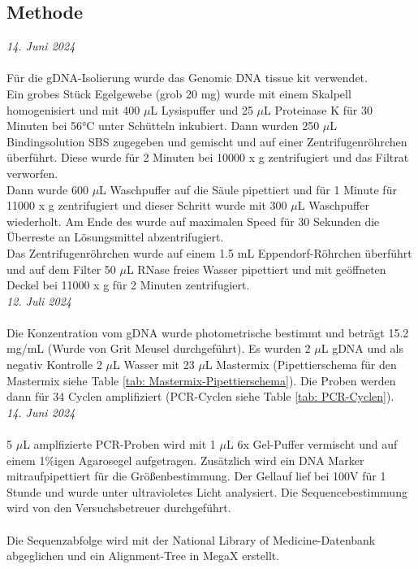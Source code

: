 \documentclass[oneside,10pt,a4paper]{report}
\begin{document}
			\subsection{Methode}
				\textit{14. Juni 2024}\\
				\\
				Für die gDNA-Isolierung wurde das Genomic DNA tissue kit verwendet.\\
				Ein grobes Stück Egelgewebe (grob 20 mg) wurde mit einem Skalpell homogenisiert und mit 400 $\mu$L Lysispuffer und 25 $\mu$L Proteinase K für 30 Minuten bei 56°C unter Schütteln inkubiert. Dann wurden 250 $\mu$L Bindingsolution SBS zugegeben und gemischt und auf einer Zentrifugenröhrchen überführt. Diese wurde für 2 Minuten bei 10000 x g zentrifugiert und das Filtrat verworfen.\\
				Dann wurde 600 $\mu$L Waschpuffer auf die Säule pipettiert und für 1 Minute für 11000 x g zentrifugiert und dieser Schritt wurde mit 300 $\mu$L Waschpuffer wiederholt. Am Ende des wurde auf maximalen Speed für 30 Sekunden die Überreste an Lösungsmittel abzentrifugiert.\\
				Das Zentrifugenröhrchen wurde auf einem 1.5 mL Eppendorf-Röhrchen überführt und auf dem Filter 50 $\mu$L RNase freies Wasser pipettiert und mit geöffneten Deckel bei 11000 x g für 2 Minuten zentrifugiert.
				\\
				\textit{12. Juli 2024}\\
				\\
				Die Konzentration vom gDNA wurde photometrische bestimmt und beträgt 15.2 mg/mL (Wurde von Grit Meusel durchgeführt).
				Es wurden 2 $\mu$L gDNA und als negativ Kontrolle 2 $\mu$L Wasser mit 23 $\mu$L Mastermix (Pipettierschema für den Mastermix siehe Table \ref{tab: Mastermix-Pipettierschema}).
				Die Proben werden dann für 34 Cyclen amplifiziert (PCR-Cyclen siehe Table \ref{tab: PCR-Cyclen}).
				\\
				\textit{14. Juni 2024}\\
				\\
				5 $\mu$L amplfizierte PCR-Proben wird mit 1 $\mu$L 6x Gel-Puffer vermischt und auf einem 1$\%$igen Agarosegel aufgetragen. Zusätzlich wird ein DNA Marker mitraufpipettiert für die Größenbestimmung.
				Der Gellauf lief bei 100V für 1 Stunde und wurde unter ultravioletes Licht analysiert. Die Sequencebestimmung wird von den Versuchsbetreuer durchgeführt.\\
				\\
				Die Sequenzabfolge wird mit der National Library of Medicine-Datenbank abgeglichen und ein Alignment-Tree in MegaX erstellt.
				
\end{document}
